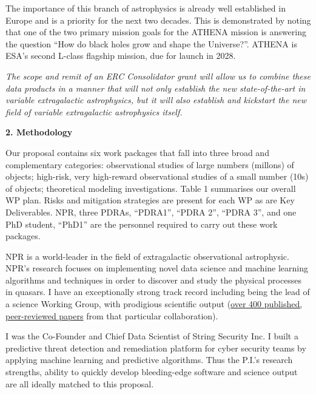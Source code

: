 \documentclass[oneside, a4paper, onecolumn, 11pt]{article}
\begin{document}
\smallskip
\smallskip
\noindent
The importance of this branch of astrophysics is already well
established in Europe and is a priority for the next two decades. This
is demonstrated by noting that one of the two primary mission goals
for the ATHENA mission is answering the question ``How do black holes
grow and shape the Universe?''.  ATHENA is ESA's second L-class
flagship mission, due for launch in 2028.

\smallskip
\smallskip
\noindent
{\it The scope and remit of an ERC Consolidator grant will allow us to
combine these data products in a manner that will not only establish
the new state-of-the-art in variable extragalactic astrophysics, but it 
will also establish and kickstart the new field of variable extragalactic
astrophysics itself.}




\medskip
\medskip
\noindent
\large
{\bf{\textcolor{Cerulean}{2. Methodology}}}
\normalsize

\noindent
Our proposal contains six work packages that fall into three broad
and complementary categories: observational studies of large numbers
(millons) of objects; high-risk, very high-reward observational
studies of a small number (10s) of objects; theoretical modeling
investigations. Table 1 summarises our overall WP plan. Risks and
mitigation strategies are present for each WP as are Key Deliverables.
NPR, three PDRAs, ``PDRA1'', ``PDRA 2'', ``PDRA 3'', and one PhD
student, ``PhD1'' are the personnel required to carry out these work packages.


\smallskip
\smallskip
\noindent
NPR is a world-leader in the field of extragalactic observational
astrophysic. NPR's research focuses on implementing novel data
science and machine learning algorithms and techniques in order to
discover and study the physical processes in quasars. I have an
exceptionally strong track record including being the lead of a
science Working Group, with prodigious scientific output
(\href{https://tinyurl.com/ycxd8lb6}{over 400 published, peer-reviewed
papers} from that particular collaboration).

\smallskip
\smallskip
\noindent
I was the Co-Founder and Chief Data Scientist of String Security
Inc. I built a predictive threat detection and remediation
platform for cyber security teams by applying machine learning and
predictive algorithms.  Thus the P.I.'s research strengths, ability to
quickly develop bleeding-edge software and science output are all
ideally matched to this proposal.
\end{document}
